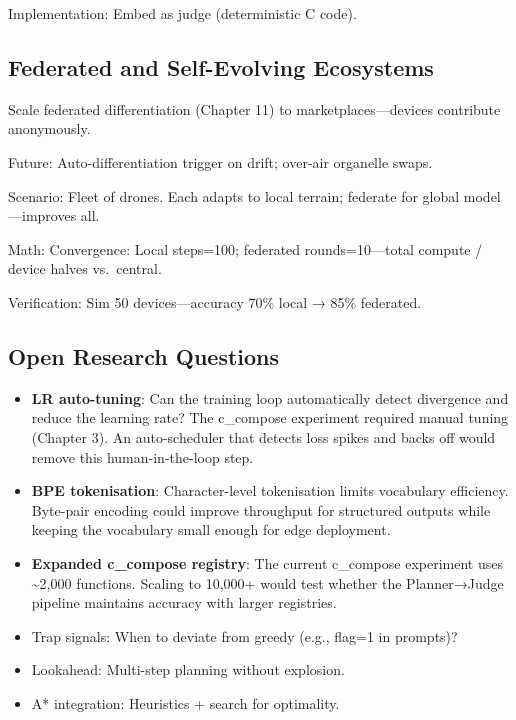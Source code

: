 \documentclass[
]{article}
\providecommand{\tightlist}{%
  \setlength{\itemsep}{0pt}\setlength{\parskip}{0pt}}
\begin{document}
Implementation: Embed as judge (deterministic C code).

\subsection{Federated and Self-Evolving
Ecosystems}\label{federated-and-self-evolving-ecosystems}

Scale federated differentiation (Chapter 11) to marketplaces---devices
contribute anonymously.

Future: Auto-differentiation trigger on drift; over-air organelle swaps.

Scenario: Fleet of drones. Each adapts to local terrain; federate for
global model---improves all.

Math: Convergence: Local steps=100; federated rounds=10---total compute
/ device halves vs.~central.

Verification: Sim 50 devices---accuracy 70\% local → 85\% federated.

\subsection{Open Research Questions}\label{open-research-questions}

\begin{itemize}
\tightlist
\item
  \textbf{LR auto-tuning}: Can the training loop automatically detect
  divergence and reduce the learning rate? The c\_compose experiment
  required manual tuning (Chapter 3). An auto-scheduler that detects
  loss spikes and backs off would remove this human-in-the-loop step.
\item
  \textbf{BPE tokenisation}: Character-level tokenisation limits
  vocabulary efficiency. Byte-pair encoding could improve throughput for
  structured outputs while keeping the vocabulary small enough for edge
  deployment.
\item
  \textbf{Expanded c\_compose registry}: The current c\_compose
  experiment uses \textasciitilde2,000 functions. Scaling to 10,000+
  would test whether the Planner→Judge pipeline maintains accuracy with
  larger registries.
\item
  Trap signals: When to deviate from greedy (e.g., flag=1 in prompts)?
\item
  Lookahead: Multi-step planning without explosion.
\item
  A* integration: Heuristics + search for optimality.
\end{itemize}
\end{document}
